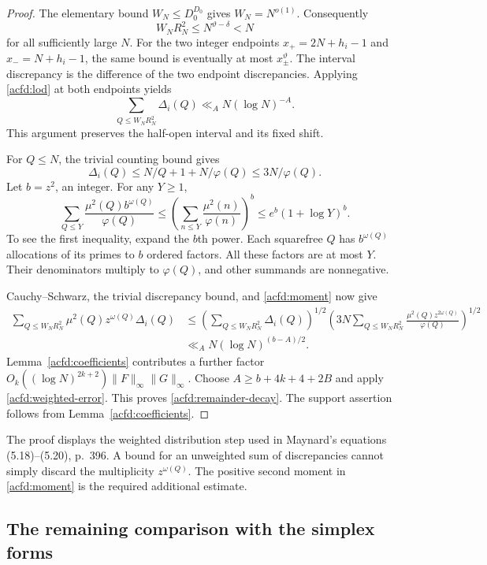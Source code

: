 \begin{proof}
The elementary bound $W_N\leq D_0^{D_0}$ gives $W_N=N^{o(1)}$.
Consequently
\[
 W_NR_N^2\leq N^{\vartheta-\delta}<N
\]
for all sufficiently large $N$.
For the two integer endpoints $x_+=2N+h_i-1$ and $x_-=N+h_i-1$,
the same bound is eventually at most $x_\pm^\vartheta$.
The interval discrepancy is the difference of the two endpoint discrepancies.
Applying \eqref{acfd:lod} at both endpoints yields
\[
 \sum_{Q\leq W_NR_N^2}\Delta_i(Q)
        \ll_A N(\log N)^{-A}.
\]
This argument preserves the half-open interval and its fixed shift.

For $Q\leq N$, the trivial counting bound gives
\[
 \Delta_i(Q)\leq N/Q+1+N/\varphi(Q)\leq3N/\varphi(Q).
\]
Let $b=z^2$, an integer.  For any $Y\geq1$,
\begin{equation}\label{acfd:moment}
 \sum_{Q\leq Y}\frac{\mu^2(Q)b^{\omega(Q)}}{\varphi(Q)}
       \leq\left(\sum_{n\leq Y}\frac{\mu^2(n)}{\varphi(n)}\right)^b
       \leq e^b(1+\log Y)^b.
\end{equation}
To see the first inequality, expand the $b$th power.
Each squarefree $Q$ has $b^{\omega(Q)}$ allocations of its primes to
$b$ ordered factors.  All these factors are at most $Y$.
Their denominators multiply to $\varphi(Q)$, and other summands are nonnegative.

Cauchy--Schwarz, the trivial discrepancy bound, and
\eqref{acfd:moment} now give
\begin{align*}
 \sum_{Q\leq W_NR_N^2}\mu^2(Q)z^{\omega(Q)}\Delta_i(Q)
 &\leq
 \left(\sum_{Q\leq W_NR_N^2}\Delta_i(Q)\right)^{1/2}
 \left(3N\sum_{Q\leq W_NR_N^2}
               \frac{\mu^2(Q)z^{2\omega(Q)}}{\varphi(Q)}\right)^{1/2}\\
 &\ll_A N(\log N)^{(b-A)/2}.
\end{align*}
Lemma~\ref{acfd:coefficients} contributes a further factor
$O_k((\log N)^{2k+2})\|F\|_\infty\|G\|_\infty$.
Choose $A\geq b+4k+4+2B$ and apply \eqref{acfd:weighted-error}.
This proves \eqref{acfd:remainder-decay}.
The support assertion follows from Lemma~\ref{acfd:coefficients}.
\end{proof}

The proof displays the weighted distribution step used in Maynard's
equations (5.18)--(5.20), p.~396.  A bound for an unweighted sum of
discrepancies cannot simply discard the multiplicity $z^{\omega(Q)}$.
The positive second moment in \eqref{acfd:moment} is the required additional estimate.

\subsection{The remaining comparison with the simplex forms}

